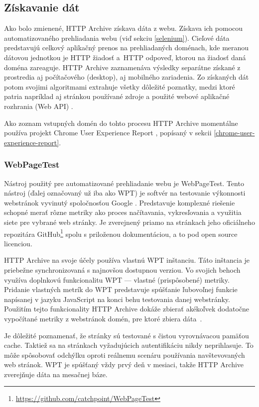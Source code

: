 \subsection{Získavanie dát}
\label{fetching-data}

Ako bolo zmienené, HTTP Archive získava dáta z webu. 
Získava ich pomocou automatizovaného prehliadania webu (viď sekciu \ref{selenium}).
Cieľové dáta predstavujú celkový aplikačný prenos na prehliadaných doménach, kde meranou dátovou jednotkou je HTTP žiadosť \mbox{a HTTP} odpoveď, ktorou na žiadosť daná doména zareaguje.
HTTP Archive zaznamenáva výsledky separátne získané z prostredia aj počítačového (desktop), aj mobilného zariadenia.
Zo získaných dát potom svojimi algoritmami extrahuje všetky dôležité poznatky, medzi ktoré patria napríklad aj stránkou používané zdroje a použité webové aplikačné rozhrania (Web API) \cite{httparchive-homepage}.

Ako zoznam vstupných domén do tohto procesu HTTP Archive momentálne používa projekt Chrome User Experience Report \cite{httparchive-faq}, popísaný v sekcii \ref{chrome-user-experience-report}.

\subsubsection{WebPageTest}

Nástroj použitý pre automatizované prehliadanie webu je WebPageTest. Tento nástroj (ďalej označovaný už iba ako WPT) je softvér na testovanie výkonnosti webstránok vyvinutý spoločnosťou Google \cite{webpagetest}. 
Predstavuje komplexné riešenie schopné merať rôzne metriky ako proces načítavania, vykresľovania a využitia siete pre vybrané web stránky. 
Je zverejnený priamo na stránkach jeho oficiálneho repozitára GitHub\footnote{\url{https://github.com/catchpoint/WebPageTest}} spolu s priloženou dokumentáciou, a to pod open source licenciou.

HTTP Archive na svoje účely používa vlastnú WPT inštanciu. 
Táto inštancia je priebežne synchronizovaná s najnovšou dostupnou verziou.
Vo svojich behoch využíva doplnkovú funkcionalitu WPT --- vlastné (prispôsobené) metriky.
Pridanie vlastných metrík do WPT predstavuje spúšťanie ľubovoľnej funkcie napísanej v jazyku JavaScript na konci behu testovania danej webstránky. 
Použitím tejto funkcionality HTTP Archive dokáže zbierať akékoľvek dodatočne vypočítané metriky z webstránok domén, pre ktoré zbiera \mbox{dáta \cite{webpagetest}}.

Je dôležité poznamenať, že stránky sú testované s čistou vyrovnávacou pamäťou cache. 
Taktiež sa na stránkach vyžadujúcich autentifikáciu nikdy neprihlasuje.
To môže spôsobovať odchýlku oproti reálnemu scenáru používania navštevovaných web stránok. 
WPT je spúšťaný vždy prvý deň v mesiaci, takže HTTP Archive zverejňuje dáta na mesačnej báze.

